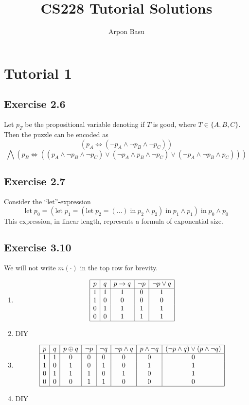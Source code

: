\documentclass{article}
\title{CS228 Tutorial Solutions}
\author{Arpon Basu}
\begin{document}
\maketitle
\tableofcontents
\pagebreak
\section{Tutorial 1}
\subsection*{Exercise 2.6}
Let $p_T$ be the propositional variable denoting if $T$ is good, where $T\in\{A, B, C\}$. 
Then the puzzle can be encoded as 
$$(p_A\Leftrightarrow (\lnot p_A\wedge\lnot p_B\wedge\lnot p_C))$$
$$\bigwedge (p_B\Leftrightarrow ((p_A\wedge\lnot p_B\wedge\lnot p_C)\lor (\lnot p_A\wedge p_B\wedge\lnot p_C)\lor (\lnot p_A\wedge\lnot p_B\wedge p_C)))$$
\subsection*{Exercise 2.7}
Consider the ``let''-expression 
$$\mathrm{let}\; p_0 = (\mathrm{let}\; p_1 = (\mathrm{let}\; p_2 = (\ldots) \;\mathrm{in}\; p_2\wedge p_2) \;\mathrm{in}\; p_1\wedge p_1) \;\mathrm{in}\; p_0\wedge p_0$$
This expression, in linear length, represents a formula of exponential size.
\subsection*{Exercise 3.10}
We will not write $m(\cdot)$ in the top row for brevity.
\begin{enumerate}[label=(\alph*)]
    \item \[
        \begin{array}{|c|c|c|c|c|}
            \hline
        p & q & p\to q & \lnot p & \lnot p\lor q \\
        \hline
        1 & 1 & 1 & 0 & 1 \\
        1 & 0 & 0 & 0 & 0 \\
        0 & 1 & 1 & 1 & 1 \\
        0 & 0 & 1 & 1 & 1 \\
        \hline
        \end{array}
        \]
    \item DIY
    \item  \[
    \begin{array}{|c|c|c|c|c|c|c|c|}
        \hline
    p & q & p\oplus q & \lnot p & \lnot q & \lnot p\wedge q & p\wedge\lnot q & (\lnot p\wedge q)\lor(p\wedge \lnot q)\\
    \hline
    1 & 1 & 0 & 0 & 0 & 0 & 0 & 0\\
    1 & 0 & 1 & 0 & 1 & 0 & 1 & 1\\
    0 & 1 & 1 & 1 & 0 & 1 & 0 & 1\\
    0 & 0 & 0 & 1 & 1 & 0 & 0 & 0\\
    \hline
    \end{array}
    \]
    \item DIY
\end{enumerate}
\end{document}
